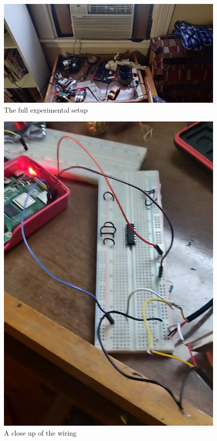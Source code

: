 \documentclass[12pt]{article}
\begin{document}
\begin{figure}
	\includegraphics[scale=0.1]{full_setup.jpg}
	\centering
	\caption{The full experimental setup}
	\label{fig2}
\end{figure}

\begin{figure}
	\includegraphics[scale=0.16]{wiring.jpg}
	\centering
	\caption{A close up of the wiring}
	\label{fig3}
\end{figure}
\end{document}
